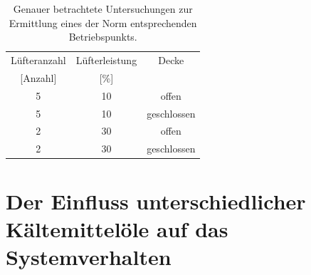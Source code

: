 \begin{table}[h!]
\centering
\caption{Genauer betrachtete Untersuchungen zur Ermittlung eines der Norm entsprechenden Betriebspunkts.}
\label{tab:Lüfterleistungen_eingegrenzt}
\begin{tabular}{|ccc|}
\hline
Lüfteranzahl            & Lüfterleistung          & Decke       \\
{[}Anzahl{]}            & {[}\%{]}                &             \\ \hline
\multicolumn{1}{|c|}{5} & \multicolumn{1}{c|}{10} & offen       \\
\multicolumn{1}{|c|}{5} & \multicolumn{1}{c|}{10} & geschlossen \\
\multicolumn{1}{|c|}{2} & \multicolumn{1}{c|}{30} & offen       \\
\multicolumn{1}{|c|}{2} & \multicolumn{1}{c|}{30} & geschlossen \\ \hline
\end{tabular}
\end{table}





\section{Der Einfluss unterschiedlicher Kältemittelöle auf das Systemverhalten}
\label{sec:Kältemittelöleanalyse}

